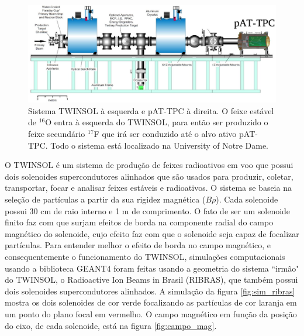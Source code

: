 \documentclass[a4paper,12pt,oneside]{book}
\begin{document}
\begin{figure}[H]
    \centering
    \includegraphics[scale = 0.35]{figs/poster3.jpeg}
    \caption{Sistema TWINSOL à esquerda e pAT-TPC à direita. O feixe estável de $^{16}$O entra à esquerda do TWINSOL, para então ser produzido o feixe secundário $^{17}$F que irá ser conduzido até o alvo ativo pAT-TPC. Todo o sistema está localizado na University of Notre Dame.}
    \label{fig:twinsol+pattpc}
\end{figure}

\par O TWINSOL é um sistema de produção de feixes radioativos em voo que possui dois solenoides supercondutores alinhados que são usados para produzir, coletar, transportar, focar e analisar feixes estáveis e radioativos. O sistema se baseia na seleção de partículas a partir da sua rigidez magnética ($B\rho$)\cite{twinsol, ribras_leo, zamora_mater}. Cada solenoide possui 30 cm de raio interno e 1 m de comprimento\cite{twinsol}. O fato de ser um solenoide finito faz com que surjam efeitos de borda na componente radial do campo magnético do solenoide, cujo efeito faz com que o solenoide seja capaz de focalizar partículas. Para entender melhor o efeito de borda no campo magnético, e consequentemente o funcionamento do TWINSOL, simulações computacionais usando a biblioteca GEANT4\cite{geant4} foram feitas usando a geometria do sistema ``irmão" do TWINSOL, o Radioactive Ion Beams in Brasil (RIBRAS), que também possui dois solenoides supercondutores alinhados\cite{ribras_leo, ribras}. A simulação da figura \ref{fig:sim_ribras} mostra os dois solenoides de cor verde focalizando as partículas de cor laranja em um ponto do plano focal em vermelho. O campo magnético em função da posição do eixo, de cada solenoide, está na figura \ref{fig:campo_mag}.


\end{document}
